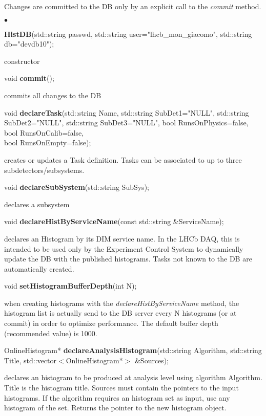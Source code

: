 \documentclass{lhcbnote}
\begin{document}
Changes are committed to the DB only by an explicit call to the {\it
commit} method.

\begin{list}{$\bullet$}{}
\item {\bf HistDB}(std::string passwd, 
		std::string user="lhcb\_mon\_giacomo", 
		std::string db="devdb10");

constructor

\item void {\bf commit}();

commits all changes to the DB


\item void {\bf declareTask}(std::string Name, 
		   std::string SubDet1="NULL", 
		   std::string SubDet2="NULL", 
		   std::string SubDet3="NULL",
		   bool RunsOnPhysics=false, 
		   bool RunsOnCalib=false,\\ 
		   bool RunsOnEmpty=false);

creates or updates a Task definition. Tasks can be associated to up to
three subdetectors/subsystems. 


\item   void {\bf declareSubSystem}(std::string SubSys);

declares a  subsystem

\item   void {\bf declareHistByServiceName}(const std::string \&ServiceName);

declares an Histogram by its DIM service name. In the LHCb
DAQ, this is intended to be used only by the Experiment Control
System to dynamically update the DB with the published histograms.
Tasks not known to the DB are automatically created.


\item void {\bf setHistogramBufferDepth}(int N);

when creating histograms with the {\it declareHistByServiceName}
method, the histogram list is actually send to the DB server every N
histograms (or at commit) in order to optimize performance. The
default buffer depth (recommended value) is 1000.  

\item OnlineHistogram* {\bf declareAnalysisHistogram}(std::string
Algorithm, std::string Title, std::vector$<$OnlineHistogram*$>$ \&Sources);

declares an histogram to be produced at analysis
level using algorithm Algorithm. Title is the histogram title. Sources
must contain the pointers to the input histograms. If the algorithm
requires an histogram set as input, use any histogram of the
set. Returns the pointer to the new histogram object.
 

\end{list}
\end{document}
